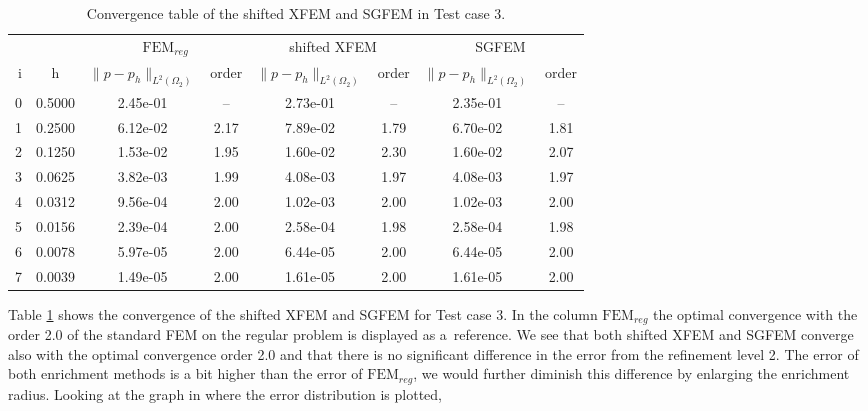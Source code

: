 \begin{table}[!htb]
\begin{center}
\bgroup
\def\arraystretch{1.2}
\setlength\tabcolsep{5pt}
\begin{tabular}{rc|cc|cc|cc}
\toprule
\multicolumn{2}{c|}{} & \multicolumn{2}{c|}{$\textrm{FEM}_{reg}$} & \multicolumn{2}{c|}{shifted XFEM} & \multicolumn{2}{c}{SGFEM}\\ [3pt] %
i & h & $\|p-p_h\|_{L^2(\Omega_2)}$ & order & $\|p-p_h\|_{L^2(\Omega_2)}$ & order & $\|p-p_h\|_{L^2(\Omega_2)}$ & order \\ [3pt] \midrule
0 & 0.5000 & 2.45e-01 & --   & 2.73e-01 & --   & 2.35e-01 & --   \\ %
1 & 0.2500 & 6.12e-02 & 2.17 & 7.89e-02 & 1.79 & 6.70e-02 & 1.81 \\ %
2 & 0.1250 & 1.53e-02 & 1.95 & 1.60e-02 & 2.30 & 1.60e-02 & 2.07 \\ %
3 & 0.0625 & 3.82e-03 & 1.99 & 4.08e-03 & 1.97 & 4.08e-03 & 1.97 \\ %
4 & 0.0312 & 9.56e-04 & 2.00 & 1.02e-03 & 2.00 & 1.02e-03 & 2.00 \\ %
5 & 0.0156 & 2.39e-04 & 2.00 & 2.58e-04 & 1.98 & 2.58e-04 & 1.98 \\ %
6 & 0.0078 & 5.97e-05 & 2.00 & 6.44e-05 & 2.00 & 6.44e-05 & 2.00 \\ %
7 & 0.0039 & 1.49e-05 & 2.00 & 1.61e-05 & 2.00 & 1.61e-05 & 2.00 \\ %
\bottomrule
\end{tabular}
\caption{Convergence table of the shifted XFEM and SGFEM in Test case 3.}
\label{tab:convergence_test3}
\egroup
\end{center}
\end{table}
%
Table \ref{tab:convergence_test3} shows the convergence of the shifted XFEM and SGFEM for Test case 3.
In the column $\textrm{FEM}_{reg}$ the optimal convergence with the order 2.0 of the standard FEM on the regular problem is displayed as a~reference.
We see that both shifted XFEM and SGFEM converge also with the optimal convergence order 2.0 and that there is no significant difference in the error 
from the refinement level 2. The error of both enrichment methods is a bit higher than the error of $\textrm{FEM}_{reg}$, we would further diminish this
difference by enlarging the enrichment radius. Looking at the graph in  where the error distribution is plotted,
